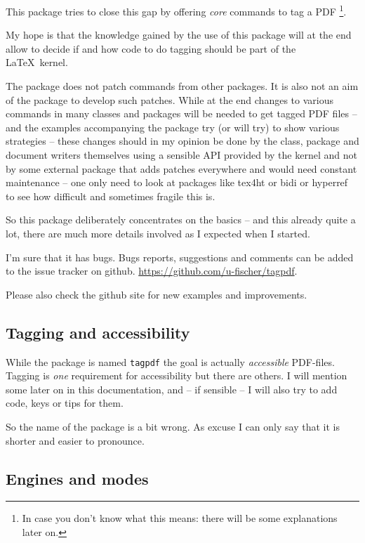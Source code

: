 \documentclass[DIV=12,parskip=half-,bibliography=totoc]{scrartcl}
\newcommand\PDF{PDF}
\begin{document}
This package tries to close this gap by offering \emph{core} commands to tag a \PDF{}%
\tagpdfparaOff\footnote{In case you don't know what this means: there will be some explanations later on.}\tagpdfparaOn.

My hope is that the knowledge gained by the use of this package will at the end allow to decide if and how code to do tagging should be part of the \LaTeX\ kernel.

The package does not patch commands from other packages. It is also not an aim of the package to develop such patches. While at the end changes to various commands in many classes and packages will be needed to get tagged \PDF{} files -- and the examples accompanying the package try (or will try) to show various strategies -- these changes should in my opinion be done by the class, package and document writers themselves using a sensible API provided by the kernel and not by some external package that adds patches everywhere and would need constant maintenance -- one only need to look at packages like tex4ht or bidi or hyperref to see how difficult and sometimes fragile this is.

So this package deliberately concentrates on the basics -- and this already quite a lot, there are much more details involved as I expected when I started.

I'm sure that it has bugs. Bugs reports, suggestions and comments can be added to the issue tracker on github. \url{https://github.com/u-fischer/tagpdf}.

Please also check the github site for new examples and improvements.

\subsection{Tagging and accessibility}

While the package is named \texttt{tagpdf} the goal is actually \emph{accessible} \PDF{}-files. Tagging is \emph{one} requirement for accessibility but there are others. I will mention some later on in this documentation, and -- if sensible -- I will also try to add code, keys or tips for them.

So the name of the package is a bit wrong. As excuse I can only say that it is shorter and easier to pronounce.


\subsection{Engines and modes}
\end{document}
